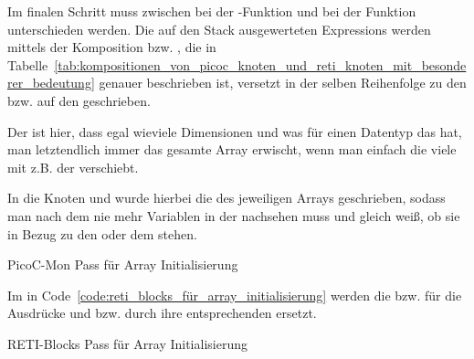 Im finalen Schritt muss zwischen  bei der -Funktion und  bei der Funktion  unterschieden werden. Die auf den Stack ausgewerteten Expressions werden mittels der Komposition  bzw. , die in Tabelle~\ref{tab:kompositionen_von_picoc_knoten_und_reti_knoten_mit_besonderer_bedeutung} genauer beschrieben ist, versetzt in der selben Reihenfolge zu den  bzw. auf den  geschrieben.

Der  ist hier, dass egal wieviele Dimensionen und was für einen Datentyp das  hat, man letztendlich immer das gesamte Array erwischt, wenn man einfach die  viele  mit z.B. der   verschiebt.

In die Knoten  und   wurde hierbei die  des jeweiligen Arrays geschrieben, sodass man nach dem  nie mehr Variablen in der   nachsehen muss und gleich weiß, ob sie in Bezug zu den  oder dem  stehen.

\begin{code}
  \centering
  \caption{PicoC-Mon Pass für Array Initialisierung}
  \label{code:picoc_mon_für_array_initialisierung}
\end{code}

Im  in Code~\ref{code:reti_blocks_für_array_initialisierung} werden die  bzw.  für die Ausdrücke  und  bzw.  durch ihre entsprechenden  ersetzt.

\begin{code}
  \centering
  \caption{RETI-Blocks Pass für Array Initialisierung}
  \label{code:reti_blocks_für_array_initialisierung}
\end{code}


